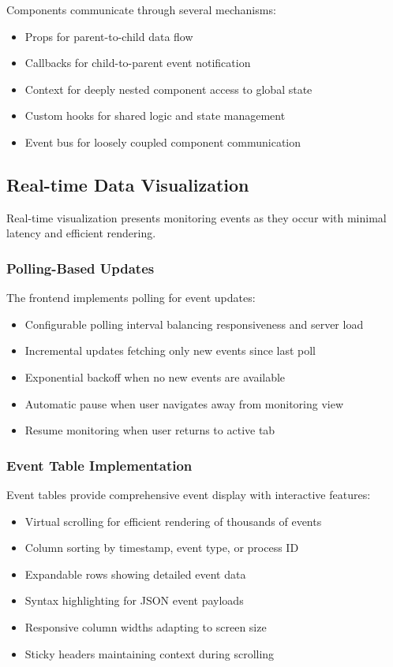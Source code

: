 Components communicate through several mechanisms:

\begin{itemize}
    \item Props for parent-to-child data flow
    \item Callbacks for child-to-parent event notification
    \item Context for deeply nested component access to global state
    \item Custom hooks for shared logic and state management
    \item Event bus for loosely coupled component communication
\end{itemize}

\subsection{Real-time Data Visualization}

Real-time visualization presents monitoring events as they occur with minimal latency and efficient rendering.

\subsubsection{Polling-Based Updates}

The frontend implements polling for event updates:

\begin{itemize}
    \item Configurable polling interval balancing responsiveness and server load
    \item Incremental updates fetching only new events since last poll
    \item Exponential backoff when no new events are available
    \item Automatic pause when user navigates away from monitoring view
    \item Resume monitoring when user returns to active tab
\end{itemize}

\subsubsection{Event Table Implementation}

Event tables provide comprehensive event display with interactive features:

\begin{itemize}
    \item Virtual scrolling for efficient rendering of thousands of events
    \item Column sorting by timestamp, event type, or process ID
    \item Expandable rows showing detailed event data
    \item Syntax highlighting for JSON event payloads
    \item Responsive column widths adapting to screen size
    \item Sticky headers maintaining context during scrolling
\end{itemize}

